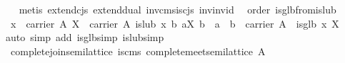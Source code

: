 \begin{isabellebody}
%
\isadelimproof
\ \ %
\endisadelimproof
%
\isatagproof
{}\isamarkupfalse%
\ {}metis\ extend{}cjs\ extend{}dual\ inv{}cms{}is{}cjs\ inv{}inv{}id{}%
\endisatagproof
{\isafoldproof}%
%
\isadelimproof
\isanewline
%
\endisadelimproof
\isanewline
{}\isamarkupfalse%
\ {}\ order{}\ is{}glb{}from{}is{}lub{}\isanewline
\ \ {}{}x\ {}\ carrier\ A{}\ X\ {}\ carrier\ A{}\ is{}lub\ x\ {}b{}\ {}{}a{}X{}\ b\ {}\ a{}\ {}\ b\ {}\ carrier\ A{}{}\ {}\ is{}glb\ x\ X{}\isanewline
%
\isadelimproof
\ \ %
\endisadelimproof
%
\isatagproof
{}\isamarkupfalse%
\ {}auto\ simp\ add{}\ is{}glb{}simp\ is{}lub{}simp{}%
\endisatagproof
{\isafoldproof}%
%
\isadelimproof
\isanewline
%
\endisadelimproof
\isanewline
{}\isamarkupfalse%
\ {}\ complete{}join{}semilattice{}\ is{}cms{}\ {}complete{}meet{}semilattice\ A{}\isanewline

\end{isabellebody}
